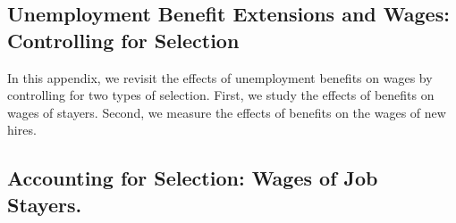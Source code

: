 \documentclass[12pt]{article}
\newcommand{\1}{\mathbf{1}}
\begin{document}
\begin{appendix}
\section{Unemployment Benefit Extensions and Wages: Controlling for Selection}
\label{app:wages}

In this appendix, we revisit the effects of unemployment benefits on wages by controlling for two types of selection. First, we study the effects of benefits on wages of stayers. Second, we measure the effects of benefits on the wages of new hires.

\subsection{Accounting for Selection: Wages of Job Stayers.} 


\end{appendix}
\end{document}
